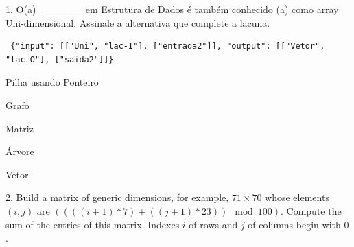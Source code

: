 \documentclass[10pt,brazil,a4paper]{exam}
\begin{document}
 \hspace{0mm} 1. %
O(a) \_\_\_\_\_\_ em Estrutura de Dados é também conhecido (a) como array Uni-dimensional. Assinale a alternativa que complete a lacuna.

\begin{verbatim}
 {"input": [["Uni", "lac-I"], ["entrada2"]], "output": [["Vetor", "lac-O"], ["saida2"]]}
\end{verbatim}

\vspace{0mm}

\begin{oneparchoices}
\choice {}\hspace{2.0mm}Pilha usando Ponteiro

\choice {}\hspace{2.0mm}Grafo

\choice {}\hspace{2.0mm}Matriz

\choice {}\hspace{2.0mm}Árvore

\choice {}Vetor

\end{oneparchoices}\vspace{1mm}



 \hspace{0mm} 2. %
Build a matrix of generic dimensions, for example, $71 \times 70$ whose elements $(i,j)$ are $((((i+1) * 7) + ((j+1) * 23)) \mod{100})$. Compute the sum of the entries of this matrix. Indexes $i$ of rows and $j$ of columns begin with $0$.

\end{document}
